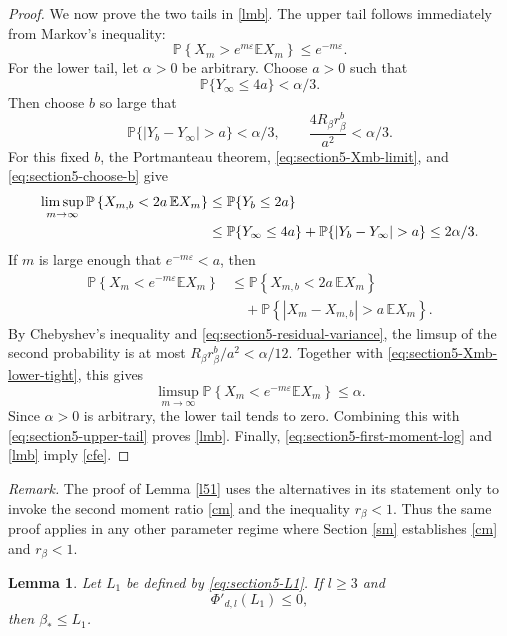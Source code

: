 \documentclass[11pt]{amsart}
\theoremstyle{plain}
\newtheorem{lemma}[theorem]{Lemma}
\numberwithin{equation}{section}
\numberwithin{theorem}{section}
\numberwithin{figure}{section}
\begin{document}
\begin{proof}
We now prove the two tails in \eqref{lmb}.  The upper tail follows immediately
from Markov's inequality:
\begin{equation}\label{eq:section5-upper-tail}
  \mathbb P\left\{X_m>e^{m\varepsilon}\mathbb E X_m\right\}
  \le e^{-m\varepsilon}.
\end{equation}
For the lower tail, let $\alpha>0$ be arbitrary.  Choose $a>0$ such that
\[
  \mathbb P\{Y_\infty\le 4a\}<\alpha/3.
\]
Then choose $b$ so large that
\begin{equation}\label{eq:section5-choose-b}
  \mathbb P\{|Y_b-Y_\infty|>a\}<\alpha/3,
  \qquad
  \frac{4R_\beta r_\beta^b}{a^2}<\alpha/3.
\end{equation}
For this fixed $b$, the Portmanteau theorem, \eqref{eq:section5-Xmb-limit}, and \eqref{eq:section5-choose-b} give
\begin{align}\label{eq:section5-Xmb-lower-tight}
  \limsup_{m\to\infty}
  \mathbb P\left\{X_{m,b}<2a\,\mathbb E X_m\right\}
  &\le \mathbb P\{Y_b\le 2a\} \notag\\
  &\le \mathbb P\{Y_\infty\le 4a\}+\mathbb P\{|Y_b-Y_\infty|>a\}\le 2\alpha/3.
\end{align}
If $m$ is large enough that $e^{-m\varepsilon}<a$, then
\begin{align*}
\mathbb P\left\{X_m<e^{-m\varepsilon}\mathbb E X_m\right\}
&\le
\mathbb P\left\{X_{m,b}<2a\,\mathbb E X_m\right\} \\
&\quad+
\mathbb P\left\{|X_m-X_{m,b}|>a\,\mathbb E X_m\right\}.
\end{align*}
By Chebyshev's inequality and \eqref{eq:section5-residual-variance}, the limsup of
the second probability is at most $R_\beta r_\beta^b/a^2<\alpha/12$.  Together with
\eqref{eq:section5-Xmb-lower-tight}, this gives
\[
  \limsup_{m\to\infty}
  \mathbb P\left\{X_m<e^{-m\varepsilon}\mathbb E X_m\right\}
  \le \alpha .
\]
Since $\alpha>0$ is arbitrary, the lower tail tends to zero.  Combining this with
\eqref{eq:section5-upper-tail} proves \eqref{lmb}.  Finally,
\eqref{eq:section5-first-moment-log} and \eqref{lmb} imply \eqref{cfe}.
\end{proof}

\noindent\emph{Remark.}
The proof of Lemma \ref{l51} uses the alternatives in its statement only to
invoke the second moment ratio \eqref{cm} and the inequality \(r_\beta<1\).
Thus the same proof applies in any other parameter regime where Section
\ref{sm} establishes \eqref{cm} and \(r_\beta<1\).

\begin{lemma}\label{lem:beta-star-below-L1}
Let $L_1$ be defined by \eqref{eq:section5-L1}.  If $l\ge3$ and
\[
  \Phi'_{d,l}(L_1)\le0,
\]
then $\beta_*\le L_1$.
\end{lemma}
\end{document}
